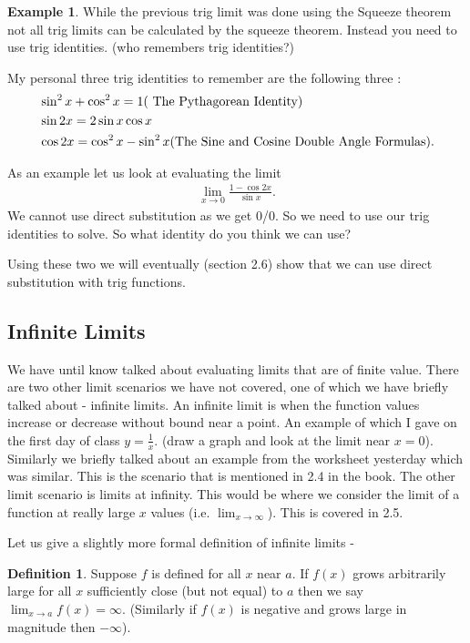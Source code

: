 \documentclass[12pt,reqno]{article}
\theoremstyle{definition}
\newtheorem*{Definition}{Definition}
\newtheorem*{Example}{Example}
\begin{document}
\begin{Example}
	While the previous trig limit was done using the Squeeze theorem not all trig limits can be calculated by the squeeze theorem. Instead you need to use trig identities. (who remembers trig identities?) 
	
	My personal three trig identities to remember are the following three : 
	\begin{align}
		&\sin^2 x + \cos^2 x = 1 (\textnormal{ The Pythagorean Identity}) \\
		&\sin 2x = 2 \sin x \cos x \\
		&\cos 2x = \cos^2 x - \sin^2 x (\textnormal{The Sine and Cosine Double Angle Formulas}).
	\end{align} 

	As an example let us look at evaluating the limit 
	\begin{align*}
		\lim_{x \to 0} \frac{1 - \cos 2x } {\sin x}.
	\end{align*}
	We cannot use direct substitution as we get 0/0. So we need to use our trig identities to solve. So what identity do you think we can use? 
\end{Example}

Using these two we will eventually (section 2.6) show that we can use direct substitution with trig functions. 

\subsection{Infinite Limits}
	We have until know talked about evaluating limits that are of finite value. There are two other limit scenarios we have not covered, one of which we have briefly talked about - infinite limits. An infinite limit is when the function values increase or decrease without bound near a point. An example of which I gave on the first day of class $y = \frac{1}{x}$. (draw a graph and look at the limit near $x = 0$). Similarly we briefly talked about an example from the worksheet yesterday which was similar. This is the scenario that is mentioned in 2.4 in the book. The other limit scenario is limits at infinity. This would be where we consider the limit of a function at really large $x$ values (i.e. $\lim_{x \to \infty}$). This is covered in 2.5. 
	
	Let us give a slightly more formal definition of infinite limits - 
	\begin{Definition}
		Suppose $f$ is defined for all $x$ near $a$. If $f(x)$ grows arbitrarily large for all $x$ sufficiently close (but not equal) to $a$ then we say $\lim_{x \to a} f(x) = \infty$. (Similarly if $f(x)$ is negative and grows large in magnitude then $-\infty$). 
	\end{Definition}
\end{document}
